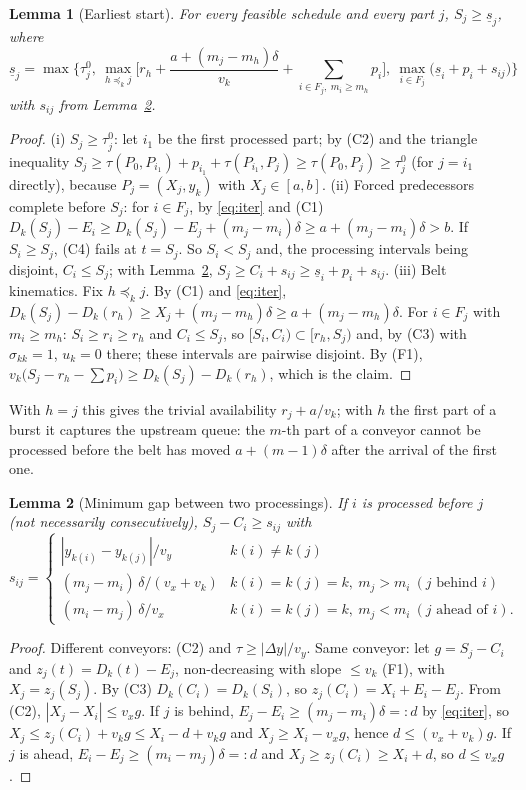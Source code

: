 \documentclass[11pt,a4paper]{article}
\theoremstyle{plain}
\newtheorem{lemma}{Lemma}
\theoremstyle{definition}
\theoremstyle{remark}
\begin{document}
\begin{lemma}[Earliest start]\label{lem:L1}
For every feasible schedule and every part $j$, $S_j\ge\underline s_j$, where
\[
\underline s_j=\max\Big\{\tau^0_j,\
\max_{h\preceq_k j}\Big[r_h+\frac{a+(m_j-m_h)\delta}{v_k}+\sum_{i\in F_j,\ m_i\ge m_h}p_i\Big],\
\max_{i\in F_j}\bigl(\underline s_i+p_i+s_{ij}\bigr)\Big\}
\]
with $s_{ij}$ from Lemma~\ref{lem:L2}.
\end{lemma}
\begin{proof}
(i) $S_j\ge\tau^0_j$: let $i_1$ be the first processed part; by (C2) and the triangle
inequality $S_j\ge\tau(P_0,P_{i_1})+p_{i_1}+\tau(P_{i_1},P_j)\ge\tau(P_0,P_j)\ge\tau^0_j$
(for $j=i_1$ directly), because $P_j=(X_j,y_k)$ with $X_j\in[a,b]$. (ii) Forced
predecessors complete before $S_j$: for $i\in F_j$, by \eqref{eq:iter} and (C1)
$D_k(S_j)-E_i\ge D_k(S_j)-E_j+(m_j-m_i)\delta\ge a+(m_j-m_i)\delta>b$. If $S_i\ge S_j$,
(C4) fails at $t=S_j$. So $S_i<S_j$ and, the processing intervals being disjoint,
$C_i\le S_j$; with Lemma~\ref{lem:L2}, $S_j\ge C_i+s_{ij}\ge\underline s_i+p_i+s_{ij}$.
(iii) Belt kinematics. Fix $h\preceq_k j$. By (C1) and \eqref{eq:iter},
$D_k(S_j)-D_k(r_h)\ge X_j+(m_j-m_h)\delta\ge a+(m_j-m_h)\delta$. For $i\in F_j$ with
$m_i\ge m_h$: $S_i\ge r_i\ge r_h$ and $C_i\le S_j$, so $[S_i,C_i)\subset[r_h,S_j)$ and, by
(C3) with $\sigma_{kk}=1$, $u_k=0$ there; these intervals are pairwise disjoint. By (F1),
$v_k\bigl(S_j-r_h-\sum p_i\bigr)\ge D_k(S_j)-D_k(r_h)$, which is the claim.
\end{proof}
With $h=j$ this gives the trivial availability $r_j+a/v_k$; with $h$ the first part of a
burst it captures the upstream queue: the $m$-th part of a conveyor cannot be processed
before the belt has moved $a+(m-1)\delta$ after the arrival of the first one.

\begin{lemma}[Minimum gap between two processings]\label{lem:L2}
If $i$ is processed before $j$ (not necessarily consecutively), $S_j-C_i\ge s_{ij}$ with
\[
s_{ij}=\begin{cases}
|y_{k(i)}-y_{k(j)}|/v_y & k(i)\ne k(j)\\[0.3ex]
(m_j-m_i)\,\delta/(v_x+v_k) & k(i)=k(j)=k,\ m_j>m_i\ (j\text{ behind } i)\\[0.3ex]
(m_i-m_j)\,\delta/v_x & k(i)=k(j)=k,\ m_j<m_i\ (j\text{ ahead of } i).
\end{cases}
\]
\end{lemma}
\begin{proof}
Different conveyors: (C2) and $\tau\ge|\Delta y|/v_y$. Same conveyor: let $g=S_j-C_i$ and
$z_j(t)=D_k(t)-E_j$, non-decreasing with slope $\le v_k$ (F1), with $X_j=z_j(S_j)$. By
(C3) $D_k(C_i)=D_k(S_i)$, so $z_j(C_i)=X_i+E_i-E_j$. From (C2), $|X_j-X_i|\le v_xg$. If $j$
is behind, $E_j-E_i\ge(m_j-m_i)\delta=:d$ by \eqref{eq:iter}, so
$X_j\le z_j(C_i)+v_kg\le X_i-d+v_kg$ and $X_j\ge X_i-v_xg$, hence $d\le(v_x+v_k)g$. If $j$
is ahead, $E_i-E_j\ge(m_i-m_j)\delta=:d$ and $X_j\ge z_j(C_i)\ge X_i+d$, so $d\le v_xg$.
\end{proof}
\end{document}
